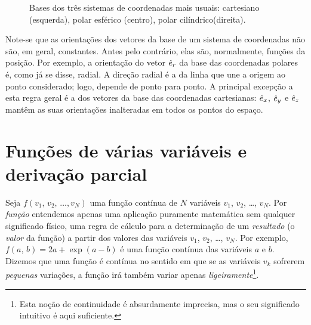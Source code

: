 \begin{figure}[htb]
{\par
}
\caption{Bases dos três sistemas de coordenadas mais usuais: cartesiano
(esquerda), polar esférico (centro), polar
cilíndrico(direita).\label{fig:10-016}}
\end{figure}
Note-se que as orientações dos vetores da base de um sistema de coordenadas não
são, em geral, constantes. Antes pelo contrário, elas são, normalmente, funções da
posição. Por exemplo, a orientação do vetor $\hat e_r$ da base das coordenadas
polares é, como já se disse, radial. A direção radial é a da linha que une a
origem ao ponto considerado; logo, depende de ponto para ponto. A principal
excepção a esta regra geral é a dos vetores da base das coordenadas cartesianas:
$\hat e_x$, $\hat e_y$ e $\hat e_z$ mantêm as suas orientações inalteradas em todos os
pontos do espaço.


\section{Funções de várias variáveis e derivação parcial}
Seja $f(v_1,\,v_2,\,\ldots,v_N)$ uma função contínua de $N$ variáveis $v_1$,
$v_2$, \ldots, $v_N$. Por \emph{função} entendemos apenas uma aplicação
puramente matemática sem qualquer significado físico, uma regra de cálculo
para a determinação de um \emph{resultado} (o \emph{valor} da função) a partir
dos valores das variáveis $v_1$, $v_2$, \ldots, $v_N$. Por exemplo, 
$f(a,\,b)=2a+\exp(a-b)$ é uma função contínua das variáveis $a$ e $b$. Dizemos
que uma função é contínua no sentido em que se as variáveis $v_k$ sofrerem
\emph{pequenas} variações, a função irá também variar apenas
\emph{ligeiramente}\footnote{Esta noção de continuidade é absurdamente
imprecisa, mas o seu significado intuitivo é aqui suficiente.}.

